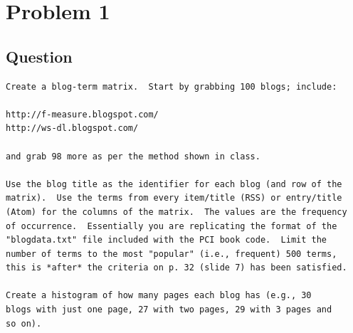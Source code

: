 \section{Problem 1}
\label{part1}
\subsection*{Question}
\begingroup
\begin{verbatim}
Create a blog-term matrix.  Start by grabbing 100 blogs; include:

http://f-measure.blogspot.com/
http://ws-dl.blogspot.com/

and grab 98 more as per the method shown in class.

Use the blog title as the identifier for each blog (and row of the
matrix).  Use the terms from every item/title (RSS) or entry/title
(Atom) for the columns of the matrix.  The values are the frequency
of occurrence.  Essentially you are replicating the format of the
"blogdata.txt" file included with the PCI book code.  Limit the
number of terms to the most "popular" (i.e., frequent) 500 terms,
this is *after* the criteria on p. 32 (slide 7) has been satisfied.

Create a histogram of how many pages each blog has (e.g., 30
blogs with just one page, 27 with two pages, 29 with 3 pages and 
so on).
\end{verbatim}
